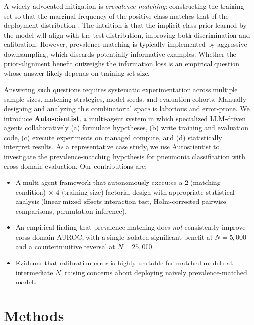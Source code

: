 \documentclass[11pt]{article}
\begin{document}
A widely advocated mitigation is \emph{prevalence matching}: constructing the training set so that the marginal frequency of the positive class matches that of the deployment distribution \cite{larrazabal2020gender}. The intuition is that the implicit class prior learned by the model will align with the test distribution, improving both discrimination and calibration. However, prevalence matching is typically implemented by aggressive downsampling, which discards potentially informative examples. Whether the prior-alignment benefit outweighs the information loss is an empirical question whose answer likely depends on training-set size.

Answering such questions requires systematic experimentation across multiple sample sizes, matching strategies, model seeds, and evaluation cohorts. Manually designing and analyzing this combinatorial space is laborious and error-prone. We introduce \textbf{Autoscientist}, a multi-agent system in which specialized LLM-driven agents collaboratively (a) formulate hypotheses, (b) write training and evaluation code, (c) execute experiments on managed compute, and (d) statistically interpret results. As a representative case study, we use Autoscientist to investigate the prevalence-matching hypothesis for pneumonia classification with cross-domain evaluation. Our contributions are:

\begin{itemize}
    \item A multi-agent framework that autonomously executes a 2 (matching condition) $\times$ 4 (training size) factorial design with appropriate statistical analysis (linear mixed effects interaction test, Holm-corrected pairwise comparisons, permutation inference).
    \item An empirical finding that prevalence matching does \emph{not} consistently improve cross-domain AUROC, with a single isolated significant benefit at $N=5{,}000$ and a counterintuitive reversal at $N=25{,}000$.
    \item Evidence that calibration error is highly unstable for matched models at intermediate $N$, raising concerns about deploying naively prevalence-matched models.
\end{itemize}

\section{Methods}
\end{document}
